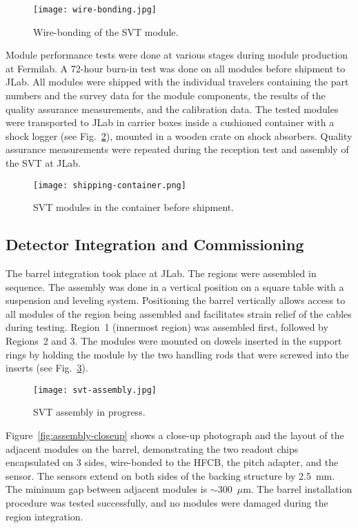 \begin{figure}[h] 
\centering 
\texttt{[image: wire-bonding.jpg]}
\caption{Wire-bonding of the SVT module.}
\label{fig:wire-bonding}
\end{figure}

Module performance tests were done at various stages during module production at Fermilab. A 72-hour burn-in test
was done on all modules before shipment to JLab. All modules were shipped with the individual travelers containing
the part numbers and the survey data for the module components, the results of the quality assurance measurements,
and the calibration data. The tested modules were transported to JLab in carrier boxes inside a cushioned container
with a shock logger (see Fig.~\ref{fig:shipping-container}), mounted in a wooden crate on shock absorbers. Quality
assurance measurements were repeated during the reception test and assembly of the SVT at JLab. 

\begin{figure}[h] 
\centering 
\texttt{[image: shipping-container.png]}
\caption{SVT modules in the container before shipment.}
\label{fig:shipping-container}
\end{figure}

\subsection{Detector Integration and Commissioning}

The barrel integration took place at JLab. The regions were assembled in sequence. The assembly was done in a
vertical position on a square table with a suspension and leveling system. Positioning the barrel vertically allows
access to all modules of the region being assembled and facilitates strain relief of the cables during testing.
Region~1 (innermost region) was assembled first, followed by Regions~2 and 3. The modules were mounted on dowels
inserted in the support rings by holding the module by the two handling rods that were screwed into the inserts (see
Fig.~\ref{fig:svt-assembly}). 

\begin{figure}[h] 
\centering 
\texttt{[image: svt-assembly.jpg]}
\caption{SVT assembly in progress.}
\label{fig:svt-assembly}
\end{figure}

Figure~\ref{fig:assembly-closeup} shows a close-up photograph and the layout of the adjacent modules on the barrel,
demonstrating the two readout chips encapsulated on 3 sides, wire-bonded to the HFCB, the pitch adapter, and the
sensor. The sensors extend on both sides of the backing structure by 2.5~mm. The minimum gap between adjacent
modules is $\sim$300~$\mu$m. The barrel installation procedure was tested successfully, and no modules were
damaged during the region integration.

